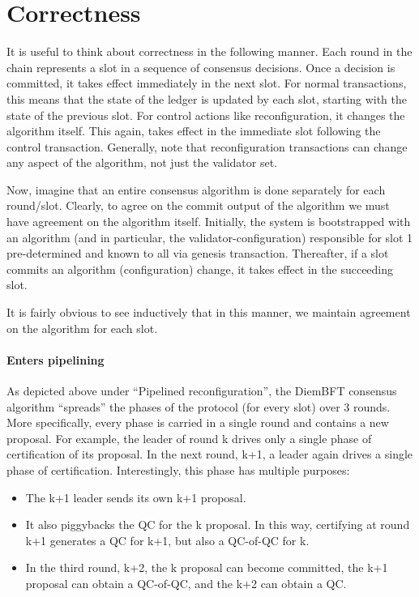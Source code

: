 \section{Correctness} \label{correctness}

It is useful to think about correctness in the following manner. Each round in the chain represents a slot in a sequence of consensus decisions.
Once a decision is committed, it takes effect immediately in the next slot. For normal transactions, this means that the state of the ledger is
updated by each slot, starting with the state of the previous slot. For control actions like reconfiguration, it changes the algorithm itself.
This again, takes effect in the immediate slot following the control transaction.
Generally, note that reconfiguration transactions can change any aspect of the algorithm, not just the validator set.

Now, imagine that an entire consensus algorithm is done separately for each round/slot. Clearly, to agree on the commit output of the algorithm
we must have agreement on the algorithm itself. Initially, the system is bootstrapped with an algorithm (and in particular, the
validator-configuration) responsible for slot 1 pre-determined and known to all via genesis transaction. Thereafter, if a slot commits an algorithm (configuration) change,
it takes effect in the succeeding slot.

It is fairly obvious to see inductively that in this manner, we maintain agreement on the algorithm for each slot.

\paragraph{Enters pipelining}

As depicted above under “Pipelined reconfiguration”, the DiemBFT consensus algorithm “spreads” the phases of the protocol (for every slot) over
3 rounds. More specifically, every phase is carried in a single round and contains a new proposal. For example, the leader of round k drives only
a single phase of certification of its proposal. In the next round, k+1, a leader again drives a single phase of certification. Interestingly,
this phase has multiple purposes:
\begin{itemize}
\item The k+1 leader sends its own k+1 proposal.
\item It also piggybacks the QC for the k proposal. In this way, certifying at round k+1 generates a QC for k+1, but also a QC-of-QC for k.
\item In the third round, k+2, the k proposal can become committed, the k+1 proposal can obtain a QC-of-QC, and the k+2 can obtain a QC.
\end{itemize}

